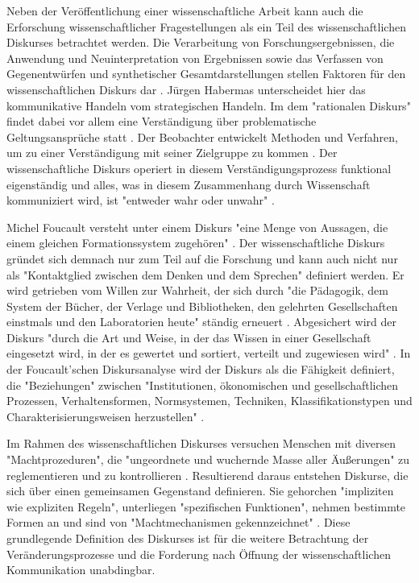Neben der Veröffentlichung einer wissenschaftliche Arbeit kann auch die Erforschung wissenschaftlicher Fragestellungen als ein Teil des wissenschaftlichen Diskurses betrachtet werden. Die Verarbeitung von Forschungsergebnissen, die Anwendung und Neuinterpretation von Ergebnissen sowie das Verfassen von Gegenentwürfen und synthetischer Gesamtdarstellungen stellen Faktoren für den wissenschaftlichen Diskurs dar \cite{Gruber_2005_diskurs}. Jürgen Habermas unterscheidet hier das kommunikative Handeln vom strategischen Handeln. Im dem "rationalen Diskurs" findet dabei vor allem eine Verständigung über problematische Geltungsansprüche statt \cite{Habermas_1981}. Der Beobachter entwickelt Methoden und Verfahren, um zu einer Verständigung mit seiner Zielgruppe zu kommen \cite[:221]{luhmann2015soziologische}. Der wissenschaftliche Diskurs operiert in diesem Verständigungsprozess funktional eigenständig und alles, was in diesem Zusammenhang durch Wissenschaft kommuniziert wird, ist "entweder wahr oder unwahr" \cite{Luhmann1998}.

Michel Foucault versteht unter einem Diskurs "eine Menge von Aussagen, die einem gleichen Formationssystem zugehören" \cite{foucault_archaologie_1981}. Der wissenschaftliche Diskurs gründet sich demnach nur zum Teil auf die Forschung und kann auch nicht nur als "Kontaktglied zwischen dem Denken und dem Sprechen" \cite{foucault_ordnung_2003} definiert werden. Er wird getrieben vom Willen zur Wahrheit, der sich durch "die Pädagogik, dem System der Bücher, der Verlage und Bibliotheken, den gelehrten Gesellschaften einstmals und den Laboratorien heute" ständig erneuert \cite{foucault_ordnung_2003}. Abgesichert wird der Diskurs "durch die Art und Weise, in der das Wissen in einer Gesellschaft eingesetzt wird, in der es gewertet und sortiert, verteilt und zugewiesen wird" \cite{foucault_ordnung_2003}. In der Foucault'schen Diskursanalyse wird der Diskurs als die Fähigkeit definiert, die "Beziehungen" zwischen "Institutionen, ökonomischen und gesellschaftlichen Prozessen, Verhaltensformen, Normsystemen, Techniken, Klassifikationstypen und Charakterisierungsweisen herzustellen" \cite{foucault_archaologie_1981}.

Im Rahmen des wissenschaftlichen Diskurses versuchen Menschen mit diversen "Machtprozeduren", die "ungeordnete und wuchernde Masse aller Äußerungen" zu reglementieren und zu kontrollieren \cite{Neymeyer_diskurs_2010}. Resultierend daraus entstehen Diskurse, die sich über einen gemeinsamen Gegenstand definieren. Sie gehorchen "impliziten wie expliziten Regeln", unterliegen "spezifischen Funktionen", nehmen bestimmte Formen an und sind von "Machtmechanismen gekennzeichnet" \cite{Neymeyer_diskurs_2010}. Diese grundlegende Definition des Diskurses ist für die weitere Betrachtung der Veränderungsprozesse und die Forderung nach Öffnung der wissenschaftlichen Kommunikation unabdingbar.

